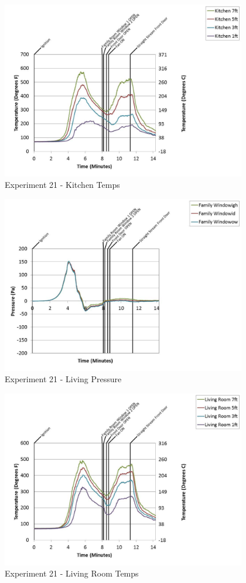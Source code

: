 \documentclass{article}
\begin{document}
\begin{appendices}
	\clearpage

	\begin{figure}[h!]
		\centering
		\includegraphics[height=3.05in]{0_Images/Results_Charts/Exp_21_Charts/KitchenTemps.pdf}
		\caption{Experiment 21 - Kitchen Temps}
	\end{figure}
 

	\begin{figure}[h!]
		\centering
		\includegraphics[height=3.05in]{0_Images/Results_Charts/Exp_21_Charts/LivingPressure.pdf}
		\caption{Experiment 21 - Living Pressure}
	\end{figure}
 
	\clearpage

	\begin{figure}[h!]
		\centering
		\includegraphics[height=3.05in]{0_Images/Results_Charts/Exp_21_Charts/LivingRoomTemps.pdf}
		\caption{Experiment 21 - Living Room Temps}
	\end{figure}
 


\end{appendices}
\end{document}
